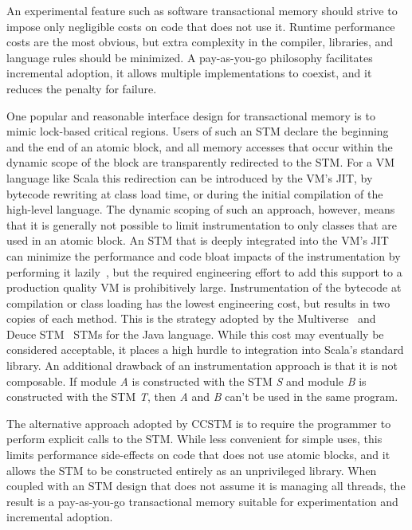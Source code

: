 
An experimental feature such as software transactional memory should
strive to impose only negligible costs on code that does not use it.
Runtime performance costs are the most obvious, but extra complexity in
the compiler, libraries, and language rules should be minimized.
A pay-as-you-go philosophy facilitates incremental adoption, it allows
multiple implementations to coexist, and it reduces the penalty for
failure.

One popular and reasonable interface design for transactional memory
is to mimic lock-based critical regions.  Users of such an STM declare
the beginning and the end of an atomic block, and all memory accesses
that occur within the dynamic scope of the block are transparently
redirected to the STM.  For a VM language like Scala this redirection
can be introduced by the VM's JIT, by bytecode rewriting at class
load time, or during the initial
compilation of the high-level language.  The dynamic scoping of such an approach,
however, means that it is generally not possible to
limit instrumentation to only classes that are used in an atomic block.
An STM that is deeply integrated into the VM's JIT can minimize the
performance and code bloat impacts of the instrumentation by performing it
lazily~\cite{??}, but the required engineering effort to add this support
to a production quality VM is prohibitively large.  Instrumentation of
the bytecode at compilation or class loading has the lowest engineering
cost, but results in two copies of each method.
This is the strategy adopted by the Multiverse~\cite{multiverse} and
Deuce STM~\cite{deucestm} STMs for the Java language.
While this cost may eventually be considered acceptable, it places a
high hurdle to integration into Scala's standard library.
An additional drawback of
an instrumentation approach is that it is not composable.  If module
\textit{A} is constructed with the STM \textit{S} and module \textit{B}
is constructed with the STM \textit{T}, then \textit{A} and \textit{B}
can't be used in the same program.

The alternative approach adopted by CCSTM is to require the programmer to perform
explicit calls to the STM.  While less convenient for simple uses, this
limits performance side-effects on code that does not use atomic blocks, and it
allows the STM to be constructed entirely as an unprivileged library.
When coupled with an STM design that does not assume it is managing all
threads, the result is a pay-as-you-go transactional memory suitable
for experimentation and incremental adoption.

